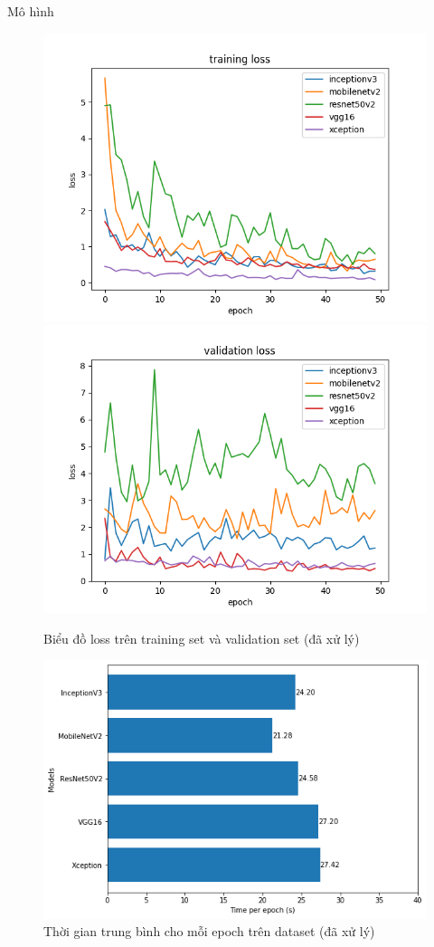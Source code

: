 \documentclass{beamer}
\begin{document}
\begin{frame}[allowframebreaks]{Mô hình}
	\begin{figure}[H]
		\centering
		\includegraphics[scale=0.3]{images/loss.png}
		\includegraphics[scale=0.3]{images/val_loss.png}
		\caption{Biểu đồ loss trên training set và validation set (đã xử lý)}
	\end{figure}
	\begin{figure}[H]
		\centering
		\includegraphics[scale=0.5]{images/processed_time}
		\caption{Thời gian trung bình cho mỗi epoch trên dataset (đã xử lý)}
	\end{figure}
	

\end{frame}
\end{document}
